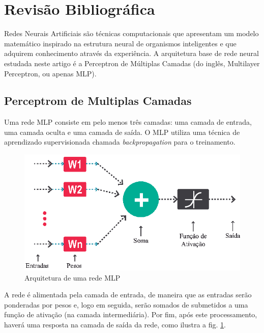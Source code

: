 \section{Revisão Bibliográfica} \label{revisaobibliografica}

Redes Neurais Artificiais são técnicas computacionais que apresentam um modelo matemático inspirado na estrutura neural de organismos inteligentes e que adquirem conhecimento através da experiência. A arquitetura base de rede neural estudada neste artigo é a Perceptron de Múltiplas Camadas (do inglês, Multilayer Perceptron, ou apenas MLP).

\subsection{Perceptrom de Multiplas Camadas}

Uma rede MLP consiste em pelo menos três camadas: uma camada de entrada, uma camada oculta e uma camada de saída. O MLP utiliza uma técnica de aprendizado supervisionada chamada \textit{backpropagation} para o treinamento.

\begin{figure}[H]

\centering %
\includegraphics{04-Figuras/Arquitetura}

\caption{Arquitetura de uma rede MLP}

\label{figura:arquitetura}

\end{figure}

A rede é alimentada pela camada de entrada, de maneira que as entradas serão ponderadas por pesos e, logo em seguida, serão somados de submetidos a uma função de ativação (na camada intermediária). Por fim, após este processamento, haverá uma resposta na camada de saída da rede, como ilustra a fig. \ref{figura:arquitetura}.




